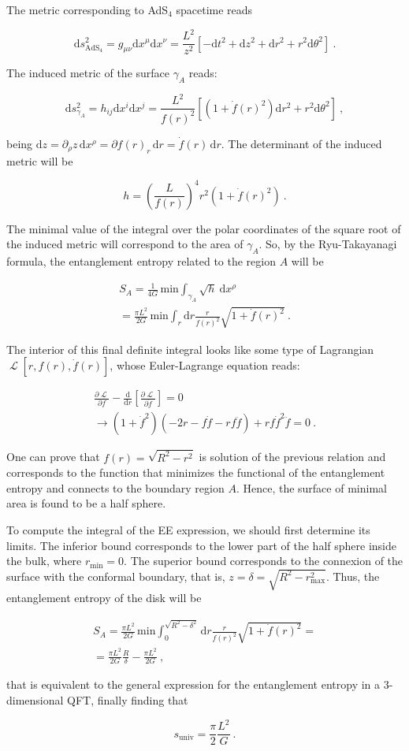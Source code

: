 \documentclass[twocolumn]{revtex4}
\providecommand{\eq}[2]{
    \begin{equation}
        #2
    \label{eq:#1}
    \end{equation}
}
\providecommand{\eqgat}[2]{
    \begin{gather}
        #2
    \label{eq:#1}
    \end{gather}
}
\DeclareMathOperator{\calL}{\mathcal{L}}
\begin{document}
The metric corresponding to AdS$_4$ spacetime reads
\eq{1Ametric}{
    \mathrm{d}s^2_{\text{AdS}_4} = g_{\mu \nu} \mathrm{d}x^\mu \mathrm{d}x^\nu = 
    \frac{L^2}{z^2} [ -\mathrm{d}t^2 + \mathrm{d}z^2 + \mathrm{d}r^2 + r^2 \mathrm{d}\theta^2 ] \ .
}
The induced metric of the surface $\gamma_A$ reads:
\eq{1gammaAmetric}{
    \mathrm{d}s^2_{\gamma_A} = h_{i j} \mathrm{d}x^i \mathrm{d}x^j = 
    \frac{L^2}{f(r)^2} \left[ \left( 1+ \dot{f}(r)^2 \right) \mathrm{d}r^2 + r^2 \mathrm{d}\theta^2 \right] \ ,
}
being $\mathrm{d}z = \partial_\rho z \, \mathrm{d}x^\rho = \partial f(r)_r \, \mathrm{d}r = \dot{f}(r) \, \mathrm{d}r$. The determinant of the induced metric will be
\eq{1h}{
    h = \left( \frac{L}{f(r)} \right) ^4 r^2 ( 1 + \dot{f}(r)^2 ) \ .
}
The minimal value of the integral over the polar coordinates of the square root of the induced metric will correspond to the area of $\gamma_A$. So, by the Ryu-Takayanagi formula, the entanglement entropy related to the region $A$ will be
\eqgat{1EEA}{
    S_A = \frac{1}{4G} \, \text{min} \int_{\gamma_A} \sqrt{h} \ \mathrm{d}x^\rho \nonumber \\
    = \frac{\pi L^2}{2G} \, \text{min} \int_r \mathrm{d}r \frac{r}{f(r)^2} \sqrt{ 1 + \dot{f}(r)^2 } \ .
}
The interior of this final definite integral looks like some type of Lagrangian $\calL [r,f(r),\dot{f}(r)]$, whose Euler-Lagrange equation reads:
\eqgat{1EL}{
    \frac{\partial \calL}{\partial f} - \frac{\mathrm{d}}{\mathrm{d}r} \left[ \frac{\partial \calL}{\partial \dot{f}} \right] = 0 \nonumber \\
    \longrightarrow \left( 1+\dot{f}^2 \right) \left( -2r-f\dot{f}-rf\ddot{f} \right) + rf\dot{f}^2\ddot{f} = 0 \ .
}
One can prove that $f(r) = \sqrt{R^2 - r^2}$ is solution of the previous relation and corresponds to the function that minimizes the functional of the entanglement entropy and connects to the boundary region $A$. Hence, the surface of minimal area is found to be a half sphere.

To compute the integral of the EE expression, we should first determine its limits. The inferior bound corresponds to the lower part of the half sphere inside the bulk, where $r_\text{min}=0$. The superior bound corresponds to the connexion of the surface with the conformal boundary, that is, $z=\delta=\sqrt{R^2-r_\text{max}^2}$. Thus, the entanglement entropy of the disk will be
\eqgat{1sol}{
    S_A = \frac{\pi L^2}{2G} \, \text{min} \int_0^{\sqrt{R^2-\delta^2}} \mathrm{d}r \frac{r}{f(r)^2} \sqrt{ 1 + \dot{f}(r)^2 } = \nonumber \\
    = \frac{\pi L^2}{2G} \frac{R}{\delta} - \frac{\pi L^2}{2G} \ ,
}
that is equivalent to the general expression for the entanglement entropy in a 3-dimensional QFT, finally finding that
\eq{F}{
    s_\text{univ} = \frac{\pi}{2} \frac{L^2}{G} \ .
}
\end{document}
